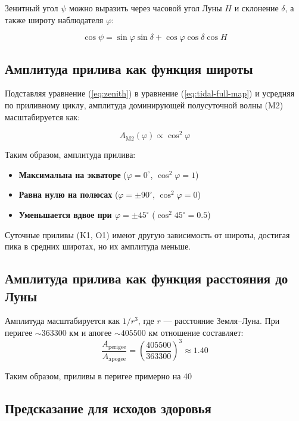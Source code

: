 \documentclass[12pt,a4paper]{article}
\theoremstyle{remark}
\begin{document}
	Зенитный угол \(\psi\) можно выразить через часовой угол Луны \(H\) и склонение \(\delta\), а также широту наблюдателя \(\varphi\):
	
	\begin{equation}
		\cos\psi = \sin\varphi \sin\delta + \cos\varphi \cos\delta \cos H
		\label{eq:zenith}
	\end{equation}
	
	\subsection{Амплитуда прилива как функция широты}
	
	Подставляя уравнение (\ref{eq:zenith}) в уравнение (\ref{eq:tidal-full-map}) и усредняя по приливному циклу, амплитуда доминирующей полусуточной волны (M2) масштабируется как:
	
	\begin{equation}
		A_{\text{M2}}(\varphi) \propto \cos^2\varphi
		\label{eq:amplitude-latitude}
	\end{equation}
	
	Таким образом, амплитуда прилива:
	\begin{itemize}
		\item \textbf{Максимальна на экваторе} (\(\varphi = 0^\circ\), \(\cos^2\varphi = 1\))
		\item \textbf{Равна нулю на полюсах} (\(\varphi = \pm 90^\circ\), \(\cos^2\varphi = 0\))
		\item \textbf{Уменьшается вдвое при \(\varphi = \pm 45^\circ\)} (\(\cos^2 45^\circ = 0.5\))
	\end{itemize}
	
	Суточные приливы (K1, O1) имеют другую зависимость от широты, достигая пика в средних широтах, но их амплитуда меньше.
	
	\subsection{Амплитуда прилива как функция расстояния до Луны}
	
	Амплитуда масштабируется как \(1/r^3\), где \(r\) — расстояние Земля–Луна. При перигее \(\sim 363 300\) км и апогее \(\sim 405 500\) км отношение составляет:
	\[
	\frac{A_{\text{perigee}}}{A_{\text{apogee}}} = \left(\frac{405 500}{363 300}\right)^3 \approx 1.40
	\]
	
	Таким образом, приливы в перигее примерно на 40%
	
	\subsection{Предсказание для исходов здоровья}
	
\end{document}
